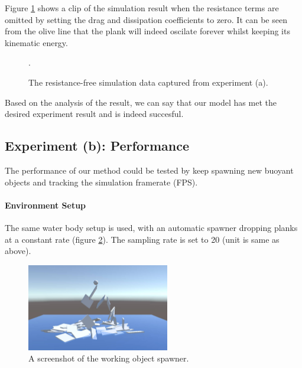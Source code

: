 Figure \ref{experiment-no-resistance} shows a clip of the simulation result when the resistance terms are omitted by setting the drag and  dissipation coefficients to zero.
It can be seen from the olive line that the plank will indeed oscilate forever whilst keeping its kinematic energy.

\begin{figure}[h]
	\centering
	\caption{The resistance-free simulation data captured from experiment (a).}.
	\label{experiment-no-resistance}
\end{figure}

Based on the analysis of the result, we can say that our model has met the desired experiment result and is indeed succesful.

\subsection{Experiment (b): Performance}

The performance of our method could be tested by keep spawning new buoyant objects and tracking the simulation framerate (FPS).

\paragraph*{Environment Setup}

The same water body setup is used, with an automatic spawner dropping planks at a constant rate (figure \ref{spawner-setup}).
The sampling rate is set to 20 (unit is same as above).

\begin{figure}[h]
	\centering
	\includegraphics[height=1.5in]{figures/spawner-setup.jpg}
	\caption{A screenshot of the working object spawner.}
	\label{spawner-setup}
\end{figure}

